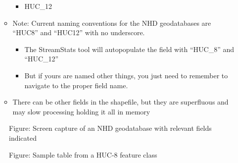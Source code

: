 \documentclass[letterpaper,10pt,english]{sphinxmanual}
\begin{document}
\begin{itemize}
\begin{itemize}
\begin{itemize}
\item {} 
HUC\_12

\end{itemize}

\item {} 
Note: Current naming conventions for the NHD geodatabases are “HUC8” and “HUC12” with no underscore.
\begin{itemize}
\item {} 
The StreamStats tool will autopopulate the field with “HUC\_8” and “HUC\_12”

\item {} 
But if yours are named other things, you just need to remember to navigate to the proper field name.

\end{itemize}

\item {} 
There can be other fields in the shapefile, but they are superfluous and may slow processing holding it all in memory

\end{itemize}

\end{itemize}

\begin{figure}[htbp]
\centering
\capstart

\noindent{}
\caption{Figure: Screen capture of an NHD geodatabase with relevant fields indicated}\label{\detokenize{ex_1:id2}}\end{figure}

\begin{figure}[htbp]
\centering
\capstart

\noindent{}
\caption{Figure: Sample table from a HUC-8 feature class}\label{\detokenize{ex_1:id3}}\end{figure}
\end{document}
